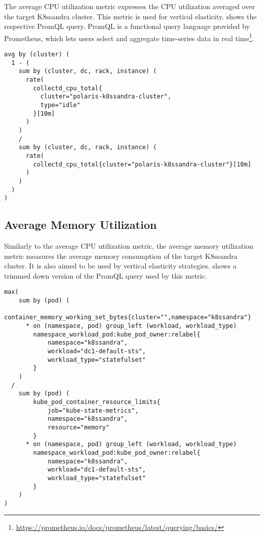 The average CPU utilization metric expresses the CPU utilization averaged over the target K8ssandra cluster. This metric is used for vertical elasticity.  shows the respective PromQL query. PromQL is a functional query language provided by Prometheus, which lets users select and aggregate time-series data in real time\footnote{\url{https://prometheus.io/docs/prometheus/latest/querying/basics/}}.

\begin{lstlisting}[caption={PromQL query used for the average CPU utilisation metric},
                    captionpos=b,
                    label=lst:avgCpuUtilization,
                    float]
avg by (cluster) (
  1 - (
    sum by (cluster, dc, rack, instance) (
      rate(
        collectd_cpu_total{
          cluster="polaris-k8ssandra-cluster",
          type="idle"
        }[10m]
      )
    )
    /
    sum by (cluster, dc, rack, instance) (
      rate(
        collectd_cpu_total{cluster="polaris-k8ssandra-cluster"}[10m]
      )
    )
  )
)
\end{lstlisting}

\subsection{Average Memory Utilization}

Similarly to the average CPU utilization metric, the average memory utilization metric measures the average memory consumption of the target K8ssandra cluster. It is also aimed to be used by vertical elasticity strategies.  shows a trimmed down version of the PromQL query used by this metric.

\begin{lstlisting}[caption={PromQL query used for the average memory utilization metric},
                    captionpos=b,
                    label=lst:avgMemoryUtilization,
                    float]
max(
    sum by (pod) (
        container_memory_working_set_bytes{cluster="",namespace="k8ssandra"}
      * on (namespace, pod) group_left (workload, workload_type)
        namespace_workload_pod:kube_pod_owner:relabel{
            namespace="k8ssandra",
            workload="dc1-default-sts",
            workload_type="statefulset"
        }
    )
  /
    sum by (pod) (
        kube_pod_container_resource_limits{
            job="kube-state-metrics",
            namespace="k8ssandra",
            resource="memory"
        }
      * on (namespace, pod) group_left (workload, workload_type)
        namespace_workload_pod:kube_pod_owner:relabel{
            namespace="k8ssandra",
            workload="dc1-default-sts",
            workload_type="statefulset"
        }
    )
)
\end{lstlisting}

